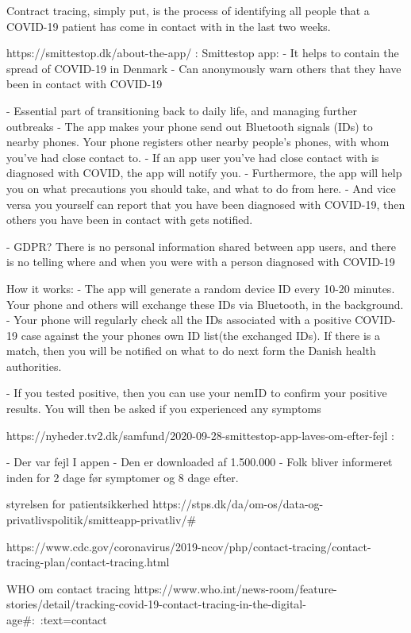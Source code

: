 Contract tracing, simply put, is the process of identifying all people that a COVID-19 patient has come in contact with in the last two weeks.

https://smittestop.dk/about-the-app/ :
Smittestop app:
-	It helps to contain the spread of COVID-19 in Denmark
-	Can anonymously warn others that they have been in contact with COVID-19

-	Essential part of transitioning back to daily life, and managing further outbreaks
-	The app makes your phone send out Bluetooth signals (IDs) to nearby phones. Your phone registers other nearby people’s phones, with whom you’ve had close contact to.
-	If an app user you’ve had close contact with is diagnosed with COVID, the app will notify you.
-	Furthermore, the app will help you on what precautions you should take, and what to do from here.
-	And vice versa you yourself can report that you have been diagnosed with COVID-19, then others you have been in contact with gets notified.

-	GDPR? There is no personal information shared between app users, and there is no telling where and when you were with a person diagnosed with COVID-19


How it works:
-	 The app will generate a random device ID every 10-20 minutes. Your phone and others will exchange these IDs via Bluetooth, in the background.
-	Your phone will regularly check all the IDs associated with a positive COVID-19 case against the your phones own ID list(the exchanged IDs). If there is a match, then you will be notified on what to do next form the Danish health authorities.

-	If you tested positive, then you can use your nemID to confirm your positive results. You will then be asked if you experienced any symptoms 


https://nyheder.tv2.dk/samfund/2020-09-28-smittestop-app-laves-om-efter-fejl :

-	Der var fejl I appen
-	Den er downloaded af 1.500.000
-	Folk bliver informeret inden for 2 dage før symptomer og 8 dage efter.

styrelsen for patientsikkerhed
https://stps.dk/da/om-os/data-og-privatlivspolitik/smitteapp-privatliv/#

https://www.cdc.gov/coronavirus/2019-ncov/php/contact-tracing/contact-tracing-plan/contact-tracing.html

WHO om contact tracing
https://www.who.int/news-room/feature-stories/detail/tracking-covid-19-contact-tracing-in-the-digital-age#:~:text=contact%